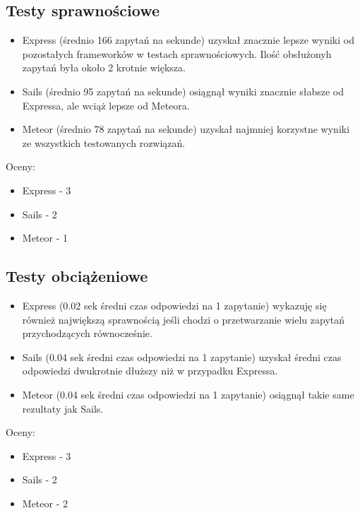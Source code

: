 \documentclass[12pt]{report}
\begin{document}
    \subsection{Testy sprawnościowe}
      \begin{itemize}
        \item Express (średnio 166 zapytań na sekunde) uzyskał znacznie lepsze wyniki od pozostałych frameworków w testach sprawnościowych. Ilość obsłużonyh zapytań była około 2 krotnie większa.
        \item Sails (średnio 95 zapytań na sekunde) osiągnął wyniki znacznie słabsze od Expressa, ale wciąż lepsze od Meteora.
        \item Meteor (średnio 78 zapytań na sekunde) uzyskał najmniej korzystne wyniki ze wszystkich testowanych rozwiązań.
      \end{itemize}
      Oceny:
      \begin{itemize}
        \item Express - 3
        \item Sails - 2
        \item Meteor - 1
      \end{itemize}
      
    \subsection{Testy obciążeniowe}
      \begin{itemize}
        \item Express (0.02 sek średni czas odpowiedzi na 1 zapytanie) wykazuję się również największą sprawnością jeśli chodzi o przetwarzanie wielu zapytań przychodzących równocześnie.
        \item Sails (0.04 sek średni czas odpowiedzi na 1 zapytanie) uzyskał średni czas odpowiedzi dwukrotnie dłuższy niż w przypadku Expressa.
        \item Meteor (0.04 sek średni czas odpowiedzi na 1 zapytanie) osiągnął takie same rezultaty jak Sails.
      \end{itemize}
      Oceny:
      \begin{itemize}
        \item Express - 3
        \item Sails - 2
        \item Meteor - 2
      \end{itemize}
    \pagebreak
\end{document}
